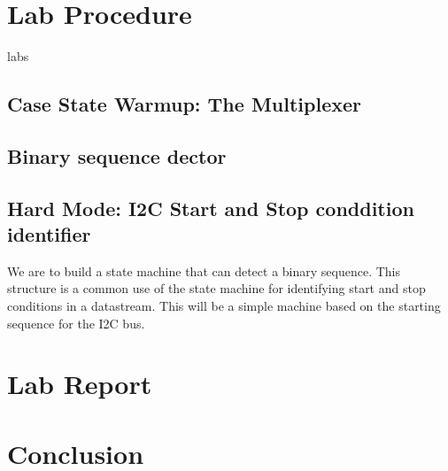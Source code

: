       \clearpage
      
\section{ Lab Procedure}
 labs 
  \subsection{Case State Warmup: The Multiplexer}

  \subsection{Binary sequence dector}

  \subsection{Hard Mode: I2C Start and Stop conddition identifier}
    We are to build a state machine that can detect a binary sequence. This structure is a common use of the state machine for identifying start and stop conditions in a datastream. This will be a simple machine based on the starting sequence for the I2C bus.
\section{ Lab Report}
  

\section{ Conclusion}
 

